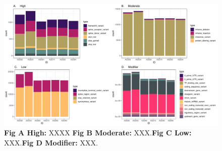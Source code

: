 \documentclass[
tikz,
11pt, %
oneside, %
english, %
singlespacing, %
headsepline, %
]{MastersDoctoralThesisV2} %
\begin{document}

\begin{figure}[H]
\centering
\includegraphics[width=1\textwidth]{fig/grid_cons.pdf}
\decoRule
\caption{\textbf{Fig A High:} XXXX \textbf{Fig B Moderate:} XXX.\textbf{Fig C Low:} XXX.\textbf{Fig D Modifier:} XXX.}
\label{fig:grid_cons}
\end{figure}
\end{document}
